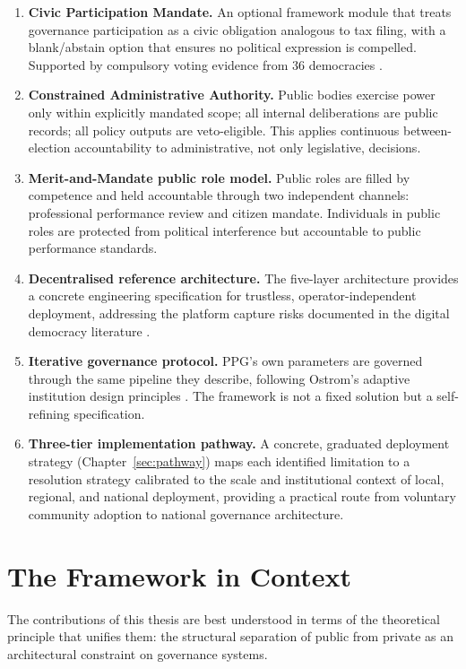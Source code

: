 \documentclass[12pt,a4paper,oneside]{report}
\begin{document}
\begin{enumerate}
  \item \textbf{Civic Participation Mandate.} An optional framework module that treats governance participation as a civic obligation analogous to tax filing, with a blank/abstain option that ensures no political expression is compelled. Supported by compulsory voting evidence from 36 democracies \citep{lijphart1997unequal, idea2021global}.
  \item \textbf{Constrained Administrative Authority.} Public bodies exercise power only within explicitly mandated scope; all internal deliberations are public records; all policy outputs are veto-eligible. This applies continuous between-election accountability to administrative, not only legislative, decisions.
  \item \textbf{Merit-and-Mandate public role model.} Public roles are filled by competence and held accountable through two independent channels: professional performance review and citizen mandate. Individuals in public roles are protected from political interference but accountable to public performance standards.
  \item \textbf{Decentralised reference architecture.} The five-layer architecture provides a concrete engineering specification for trustless, operator-independent deployment, addressing the platform capture risks documented in the digital democracy literature \citep{mueller2019digital}.
  \item \textbf{Iterative governance protocol.} PPG's own parameters are governed through the same pipeline they describe, following Ostrom's adaptive institution design principles \citep{ostrom1990governing}. The framework is not a fixed solution but a self-refining specification.
  \item \textbf{Three-tier implementation pathway.} A concrete, graduated deployment strategy (Chapter~\ref{sec:pathway}) maps each identified limitation to a resolution strategy calibrated to the scale and institutional context of local, regional, and national deployment, providing a practical route from voluntary community adoption to national governance architecture.
\end{enumerate}

\section{The Framework in Context}

The contributions of this thesis are best understood in terms of the theoretical principle that unifies them: the structural separation of public from private as an architectural constraint on governance systems.
\end{document}
